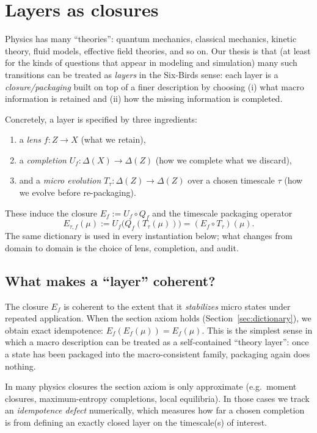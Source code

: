 \documentclass[11pt]{article}
\providecommand{\Z}{Z}
\providecommand{\X}{X}
\providecommand{\Dist}[1]{\Delta(#1)}
\providecommand{\Lens}{f}
\providecommand{\Qf}{Q_f}
\providecommand{\Uf}{U_f}
\providecommand{\Etauf}{E_{\tau,f}}
\begin{document}
 \section{Layers as closures}
\label{sec:layers-closures}

Physics has many ``theories'': quantum mechanics, classical mechanics, kinetic theory, fluid models, effective field theories, and so on. Our thesis is that (at least for the kinds of questions that appear in modeling and simulation) many such transitions can be treated as \emph{layers} in the Six-Birds sense: each layer is a \emph{closure/packaging} built on top of a finer description by choosing (i) what macro information is retained and (ii) how the missing information is completed.

Concretely, a layer is specified by three ingredients:
\begin{enumerate}
  \item a \emph{lens} $\Lens:\Z\to\X$ (what we retain),
  \item a \emph{completion} $\Uf:\Dist{\X}\to\Dist{\Z}$ (how we complete what we discard),
  \item and a \emph{micro evolution} $T_\tau:\Dist{\Z}\to\Dist{\Z}$ over a chosen timescale $\tau$ (how we evolve before re-packaging).
\end{enumerate}
These induce the closure $E_f := \Uf\circ \Qf$ and the timescale packaging operator
\[
  \Etauf(\mu) := \Uf\!\bigl(\Qf(T_\tau(\mu))\bigr) = (E_f\circ T_\tau)(\mu).
\]
The same dictionary is used in every instantiation below; what changes from domain to domain is the choice of lens, completion, and audit.

\subsection{What makes a ``layer'' coherent?}
The closure $E_f$ is coherent to the extent that it \emph{stabilizes} micro states under repeated application. When the section axiom holds (Section~\ref{sec:dictionary}), we obtain exact idempotence: $E_f(E_f(\mu)) = E_f(\mu)$. This is the simplest sense in which a macro description can be treated as a self-contained ``theory layer'': once a state has been packaged into the macro-consistent family, packaging again does nothing.

In many physics closures the section axiom is only approximate (e.g.\ moment closures, maximum-entropy completions, local equilibria). In those cases we track an \emph{idempotence defect} numerically, which measures how far a chosen completion is from defining an exactly closed layer on the timescale(s) of interest.
\end{document}
